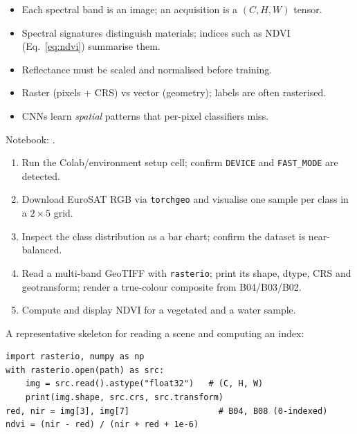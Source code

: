 \begin{keybox}
\begin{itemize}[leftmargin=1.2em,nosep]
  \item Each spectral band is an image; an acquisition is a $(C,H,W)$ tensor.
  \item Spectral signatures distinguish materials; indices such as NDVI
  (Eq.~\ref{eq:ndvi}) summarise them.
  \item Reflectance must be scaled and normalised before training.
  \item Raster (pixels + CRS) vs vector (geometry); labels are often rasterised.
  \item CNNs learn \emph{spatial} patterns that per-pixel classifiers miss.
\end{itemize}
\end{keybox}

\begin{practbox}
Notebook: .
\begin{enumerate}[leftmargin=1.4em,nosep]
  \item Run the Colab/environment setup cell; confirm \texttt{DEVICE} and
  \texttt{FAST\_MODE} are detected.
  \item Download EuroSAT RGB via \texttt{torchgeo} and visualise one sample per
  class in a $2\times5$ grid.
  \item Inspect the class distribution as a bar chart; confirm the dataset is
  near-balanced.
  \item Read a multi-band GeoTIFF with \texttt{rasterio}; print its shape, dtype,
  CRS and geotransform; render a true-colour composite from B04/B03/B02.
  \item Compute and display NDVI for a vegetated and a water sample.
\end{enumerate}
A representative skeleton for reading a scene and computing an index:
\begin{lstlisting}
import rasterio, numpy as np
with rasterio.open(path) as src:
    img = src.read().astype("float32")   # (C, H, W)
    print(img.shape, src.crs, src.transform)
red, nir = img[3], img[7]                  # B04, B08 (0-indexed)
ndvi = (nir - red) / (nir + red + 1e-6)
\end{lstlisting}
\end{practbox}

